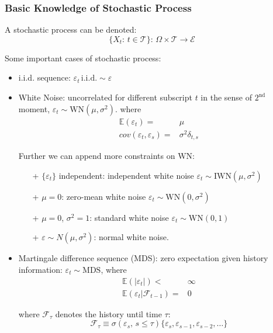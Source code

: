 \subsubsection{Basic Knowledge of Stochastic Process}
    A stochastic process can be denoted:
    \begin{equation}
        \{X_t:\,t\in \mathcal{T}\}:\, \Omega\times \mathcal{T}\to \mathcal{E}
    \end{equation}
    
\begin{point}
    Some important cases of stochastic process:
\end{point}

    
    \begin{itemize}[topsep=2pt,itemsep=0pt]
        \item i.i.d. sequence: $ \varepsilon _t\,\mathrm{i.i.d.}\sim \varepsilon   $        
        \item White Noise: uncorrelated for different subscript $ t $ in the sense of $ 2^\mathrm{nd}  $ moment, $ \varepsilon _t\sim \mathrm{WN}(\mu ,\sigma ^2)  $. where
        \begin{align*}
            \mathbb{E}\left( \varepsilon _t \right) =&\mu \\
            cov(\varepsilon _t,\varepsilon _s)=&\sigma ^2\delta _{t,s}
        \end{align*}

        Further we can append more constraints on $ \mathrm{WN}  $:
        \begin{itemize}[topsep=2pt,itemsep=0pt]
            \item[+] $ \{\varepsilon _t\} $ independent: independent white noise $ \varepsilon _t\sim \mathrm{IWN}(\mu ,\sigma ^2)  $ 
            \item[+] $ \mu =0 $: zero-mean white noise $ \varepsilon _t\sim \mathrm{WN}(0 ,\sigma ^2)  $
            \item[+] $ \mu =0 $, $ \sigma ^2=1 $: standard white noise $ \varepsilon _t\sim \mathrm{WN}(0,1)  $
            \item[+] $ \varepsilon \sim N(\mu ,\sigma ^2) $: normal white noise.
        \end{itemize}
        \item Martingale difference sequence (MDS): zero expectation given history information: $ \varepsilon _t\sim \mathrm{MDS}  $, where
        \begin{align*}
            \mathbb{E}\left( |\varepsilon _t| \right) <&\infty\\
            \mathbb{E}\left( \varepsilon _t|\mathcal{F}_{t-1} \right) =&0
        \end{align*}

        where $ \mathcal{F}_\tau $ denotes the history until time $ \tau $:
        \begin{equation}
            \mathcal{F}_\tau\equiv \sigma \left(\varepsilon _s,\, s\leq \tau\right)\{\varepsilon _s,\varepsilon _{s-1},\varepsilon _{s-2},\ldots\} 
        \end{equation}
    \end{itemize}

